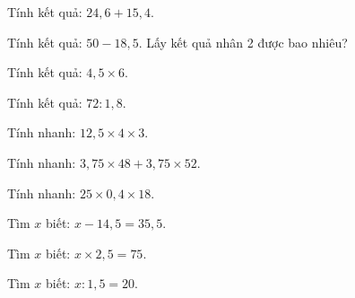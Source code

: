 
\begin{ex}
  Tính kết quả: $24{,}6 + 15{,}4$.
\end{ex}

\begin{ex}
  Tính kết quả: $50 - 18{,}5$. Lấy kết quả nhân 2 được bao nhiêu?
\end{ex}

\begin{ex}
  Tính kết quả: $4{,}5 \times 6$.
\end{ex}

\begin{ex}
  Tính kết quả: $72 : 1{,}8$.
\end{ex}

\begin{ex}
  Tính nhanh: $12{,}5 \times 4 \times 3$.
\end{ex}

\begin{ex}
  Tính nhanh: $3{,}75 \times 48 + 3{,}75 \times 52$.
\end{ex}

\begin{ex}
  Tính nhanh: $25 \times 0{,}4 \times 18$.
\end{ex}

\begin{ex}
  Tìm $x$ biết: $x - 14{,}5 = 35{,}5$.
\end{ex}

\begin{ex}
  Tìm $x$ biết: $x \times 2{,}5 = 75$.
\end{ex}

\begin{ex}
  Tìm $x$ biết: $x : 1{,}5 = 20$.
\end{ex}

